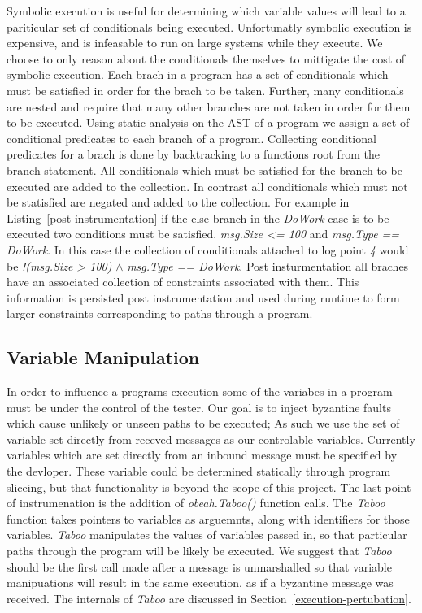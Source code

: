 Symbolic execution is useful for determining which variable values will lead to
a pariticular set of conditionals being executed. Unfortunatly symbolic
execution is expensive, and is infeasable to run on large systems while they
execute. We choose to only reason about the conditionals themselves to
mittigate the cost of symbolic execution. Each brach in a program has a set of
conditionals which must be satisfied in order for the brach to be taken.
Further, many conditionals are nested and require that many other branches are
not taken in order for them to be executed. Using static analysis on the AST of
a program we assign a set of conditional predicates to each branch of a
program. Collecting conditional predicates for a brach is done by backtracking
to a functions root from the branch statement. All conditionals which must be
satisfied for the branch to be executed are added to the collection. In
contrast all conditionals which must not be statisfied are negated and added to
the collection. For example in Listing~\ref{post-instrumentation} if the else
branch in the \emph{DoWork} case is to be executed two conditions must be
satisfied. \emph{msg.Size <= 100} and \emph{msg.Type == DoWork}. In this case
the collection of conditionals attached to log point \emph{4} would be
\emph{!(msg.Size > 100)} $\wedge$ \emph{msg.Type == DoWork}. Post
insturmentation all braches have an associated collection of constraints
associated with them. This information is persisted post instrumentation and
used during runtime to form larger constraints corresponding to paths through a
program.

\subsection{Variable Manipulation}

In order to influence a programs execution some of the variabes in a program
must be under the control of the tester. Our goal is to inject byzantine faults
which cause unlikely or unseen paths to be executed; As such we use the set of
variable set directly from receved messages as our controlable variables.
Currently variables which are set directly from an inbound message must be
specified by the devloper. These variable could be determined statically
through program sliceing, but that functionality is beyond the scope of this
project. The last point of instrumenation is the addition of
\emph{obeah.Taboo()} function calls. The \emph{Taboo} function takes pointers
to variables as arguemnts, along with identifiers for those variables.
\emph{Taboo} manipulates the values of variables passed in, so that particular
paths through the program will be likely be executed. We suggest that
\emph{Taboo} should be the first call made after a message is unmarshalled so
that variable manipuations will result in the same execution, as if a byzantine
message was received. The internals of \emph{Taboo} are discussed in
Section~\ref{execution-pertubation}.


